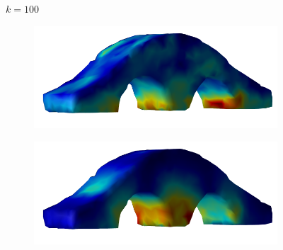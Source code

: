 \documentclass[11pt,titlepage]{article}
\begin{document}
\begin{figure}[!htbp]
\begin{center}
        $k=100$
        \quad
        \begin{subfigure}[b]{0.4\textwidth}
            \centering
            \includegraphics[width=\textwidth]{jacopt_vm/resized/archbridge_tiny_100}
        \end{subfigure}
        \begin{subfigure}[b]{0.4\textwidth}
            \centering
            \includegraphics[width=\textwidth]{soropt_vm/resized/archbridge_tiny_100}
        \end{subfigure}\\ 



\end{center}
\end{figure}
\end{document}
